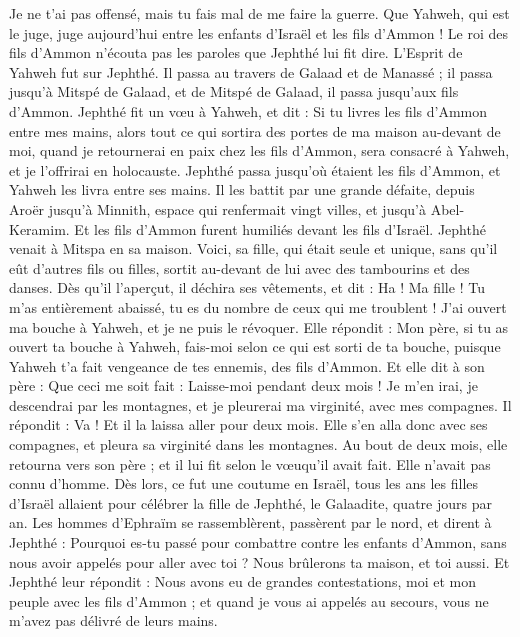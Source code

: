 \begin{multicols}{2}
Je ne t'ai pas offensé, mais tu fais mal de me faire la guerre. Que Yahweh, qui est le juge, juge aujourd'hui entre les enfants d'Israël et les fils d'Ammon !
Le roi des fils d'Ammon n'écouta pas les paroles que Jephthé lui fit dire.
L'Esprit de Yahweh fut sur Jephthé. Il passa au travers de Galaad et de Manassé ; il passa jusqu'à Mitspé de Galaad, et de Mitspé de Galaad, il passa jusqu'aux fils d'Ammon.
Jephthé fit un vœu à Yahweh, et dit : Si tu livres les fils d'Ammon entre mes mains,
alors tout ce qui sortira des portes de ma maison au-devant de moi, quand je retournerai en paix chez les fils d'Ammon, sera consacré à Yahweh, et je l'offrirai en holocauste.
Jephthé passa jusqu'où étaient les fils d'Ammon, et Yahweh les livra entre ses mains.
Il les battit par une grande défaite, depuis Aroër jusqu'à Minnith, espace qui renfermait vingt villes, et jusqu'à Abel-Keramim. Et les fils d'Ammon furent humiliés devant les fils d'Israël.
Jephthé venait à Mitspa en sa maison. Voici, sa fille, qui était seule et unique, sans qu'il eût d'autres fils ou filles, sortit au-devant de lui avec des tambourins et des danses.
Dès qu'il l'aperçut, il déchira ses vêtements, et dit : Ha ! Ma fille ! Tu m'as entièrement abaissé, tu es du nombre de ceux qui me troublent ! J'ai ouvert ma bouche à Yahweh, et je ne puis le révoquer.
Elle répondit : Mon père, si tu as ouvert ta bouche à Yahweh, fais-moi selon ce qui est sorti de ta bouche, puisque Yahweh t'a fait vengeance de tes ennemis, des fils d'Ammon.
Et elle dit à son père : Que ceci me soit fait : Laisse-moi pendant deux mois ! Je m'en irai, je descendrai par les montagnes, et je pleurerai ma virginité, avec mes compagnes.
Il répondit : Va ! Et il la laissa aller pour deux mois. Elle s'en alla donc avec ses compagnes, et pleura sa virginité dans les montagnes.
Au bout de deux mois, elle retourna vers son père ; et il lui fit selon le vœuqu'il avait fait. Elle n'avait pas connu d'homme. Dès lors, ce fut une coutume en Israël,
tous les ans les filles d'Israël allaient pour célébrer la fille de Jephthé, le Galaadite, quatre jours par an.
\VerseOne{}Les hommes d'Ephraïm se rassemblèrent, passèrent par le nord, et dirent à Jephthé : Pourquoi es-tu passé pour combattre contre les enfants d'Ammon, sans nous avoir appelés pour aller avec toi ? Nous brûlerons ta maison, et toi aussi.
Et Jephthé leur répondit : Nous avons eu de grandes contestations, moi et mon peuple avec les fils d'Ammon ; et quand je vous ai appelés au secours, vous ne m'avez pas délivré de leurs mains.

\end{multicols}
